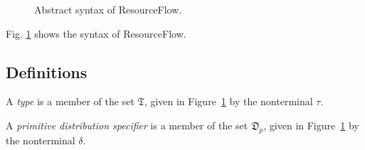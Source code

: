 \documentclass[10pt]{article}
\newcommand{\langName}{ResourceFlow\xspace}
\begin{document}
\begin{figure}[ht]
\begin{tabular}{l r l l}


\end{tabular}
\caption{Abstract syntax of \langName.}
\label{lang-syntax}
\end{figure}

Fig. \ref{lang-syntax} shows the syntax of \langName.

\subsection{Definitions}
\begin{definition}
    A \emph{type} is a member of the set $\mathfrak{T}$, given in Figure~\ref{lang-syntax} by the nonterminal $\tau$.
\end{definition}
\begin{definition}
    A \emph{primitive distribution specifier} is a member of the set $\mathfrak{D}_p$, given in Figure~\ref{lang-syntax} by the nonterminal $\delta$.
\end{definition}
\end{document}
